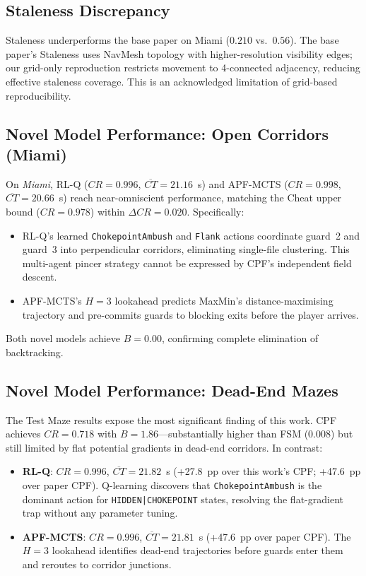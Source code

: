 \documentclass[conference,onecolumn]{IEEEtran}
\begin{document}
\subsection{Staleness Discrepancy}
Staleness underperforms the base paper on Miami ($0.210$ vs.\
$0.56$). The base paper's Staleness uses NavMesh topology with
higher-resolution visibility edges; our grid-only reproduction
restricts movement to 4-connected adjacency, reducing effective
staleness coverage. This is an acknowledged limitation of
grid-based reproducibility.

\subsection{Novel Model Performance: Open Corridors (Miami)}
On \emph{Miami}, RL-Q ($CR = 0.996$, $\overline{CT} = 21.16$~s) and
APF-MCTS ($CR = 0.998$, $\overline{CT} = 20.66$~s) reach
near-omniscient performance, matching the Cheat upper bound
($CR = 0.978$) within $\Delta CR = 0.020$. Specifically:
\begin{itemize}
  \item RL-Q's learned \texttt{ChokepointAmbush} and
        \texttt{Flank} actions coordinate guard~2 and guard~3
        into perpendicular corridors, eliminating single-file
        clustering. This multi-agent pincer strategy cannot be
        expressed by CPF's independent field descent.
  \item APF-MCTS's $H{=}3$ lookahead predicts MaxMin's
        distance-maximising trajectory and pre-commits guards to
        blocking exits before the player arrives.
\end{itemize}
Both novel models achieve $B = 0.00$, confirming complete
elimination of backtracking.

\subsection{Novel Model Performance: Dead-End Mazes}
The Test Maze results expose the most significant finding of this
work. CPF achieves $CR = 0.718$ with $B = 1.86$---substantially
higher than FSM ($0.008$) but still limited by flat potential
gradients in dead-end corridors. In contrast:
\begin{itemize}
  \item \textbf{RL-Q}: $CR = 0.996$, $\overline{CT} = 21.82$~s
        (+27.8~pp over this work's CPF; +47.6~pp over paper CPF).
        Q-learning discovers that \texttt{ChokepointAmbush} is the
        dominant action for \texttt{HIDDEN|CHOKEPOINT} states,
        resolving the flat-gradient trap without any parameter
        tuning.
  \item \textbf{APF-MCTS}: $CR = 0.996$, $\overline{CT} = 21.81$~s
        (+47.6~pp over paper CPF). The $H{=}3$ lookahead identifies
        dead-end trajectories before guards enter them and reroutes
        to corridor junctions.
\end{itemize}
\end{document}
